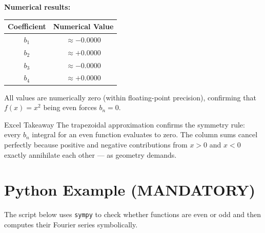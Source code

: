 \documentclass[12pt,a4paper]{article}
\begin{document}
\medskip
\textbf{Numerical results:}
\begin{center}
\begin{tabular}{@{}cc@{}}
\toprule
\textbf{Coefficient} & \textbf{Numerical Value} \\
\midrule
$b_1$ & $\approx -0.0000$ \\
$b_2$ & $\approx +0.0000$ \\
$b_3$ & $\approx -0.0000$ \\
$b_4$ & $\approx +0.0000$ \\
\bottomrule
\end{tabular}
\end{center}

All values are numerically zero (within floating-point precision), confirming that $f(x) = x^2$
being even forces $b_n = 0$.

\begin{learnbox}{Excel Takeaway}
The trapezoidal approximation confirms the symmetry rule: every $b_n$ integral for an even
function evaluates to zero. The column sums cancel perfectly because positive and negative
contributions from $x > 0$ and $x < 0$ exactly annihilate each other --- as geometry demands.
\end{learnbox}

\section{Python Example (MANDATORY)}

The script below uses \texttt{sympy} to check whether functions are even or odd and then
computes their Fourier series symbolically.
\end{document}
